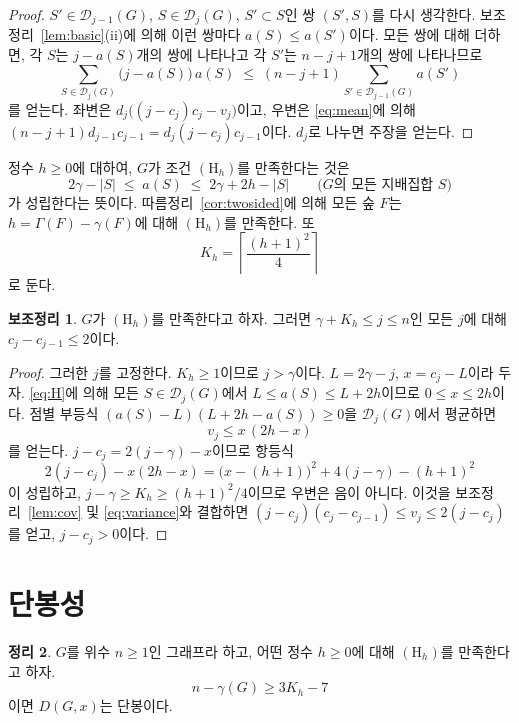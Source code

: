 \documentclass[11pt,a4paper]{article}
\theoremstyle{definition}
\newtheorem{theorem}{정리}[section]
\newtheorem{lemma}[theorem]{보조정리}
\newcommand{\Dom}{\mathcal{D}}
\begin{document}
\begin{proof}
$S'\in\Dom_{j-1}(G)$, $S\in\Dom_j(G)$, $S'\subset S$인 쌍 $(S',S)$를 다시 생각한다.
보조정리~\ref{lem:basic}(ii)에 의해 이런 쌍마다 $a(S)\le a(S')$이다. 모든 쌍에 대해
더하면, 각 $S$는 $j-a(S)$개의 쌍에 나타나고 각 $S'$는 $n-j+1$개의 쌍에 나타나므로
\[
  \sum_{S\in\Dom_j(G)}\bigl(j-a(S)\bigr)\,a(S)\;\le\;
  (n-j+1)\sum_{S'\in\Dom_{j-1}(G)}a(S')
\]
를 얻는다. 좌변은 $d_j\bigl((j-c_j)c_j-v_j\bigr)$이고, 우변은 \eqref{eq:mean}에 의해
$(n-j+1)d_{j-1}c_{j-1}=d_j(j-c_j)c_{j-1}$이다. $d_j$로 나누면 주장을 얻는다.
\end{proof}

정수 $h\ge0$에 대하여, $G$가 조건 $(\mathrm{H}_h)$를 만족한다는 것은
\begin{equation}\label{eq:H}
  2\gamma-|S|\;\le\;a(S)\;\le\;2\gamma+2h-|S|
  \qquad\text{($G$의 모든 지배집합 $S$)}
\end{equation}
가 성립한다는 뜻이다. 따름정리~\ref{cor:twosided}에 의해 모든 숲 $F$는
$h=\Gamma(F)-\gamma(F)$에 대해 $(\mathrm{H}_h)$를 만족한다. 또
\[
  K_h=\left\lceil\frac{(h+1)^2}{4}\right\rceil
\]
로 둔다.

\begin{lemma}\label{lem:jump}
$G$가 $(\mathrm{H}_h)$를 만족한다고 하자. 그러면 $\gamma+K_h\le j\le n$인 모든 $j$에
대해 $c_j-c_{j-1}\le 2$이다.
\end{lemma}

\begin{proof}
그러한 $j$를 고정한다. $K_h\ge1$이므로 $j>\gamma$이다. $L=2\gamma-j$, $x=c_j-L$이라
두자. \eqref{eq:H}에 의해 모든 $S\in\Dom_j(G)$에서 $L\le a(S)\le L+2h$이므로
$0\le x\le 2h$이다. 점별 부등식 $(a(S)-L)(L+2h-a(S))\ge0$을 $\Dom_j(G)$에서 평균하면
\begin{equation}\label{eq:variance}
  v_j\le x\,(2h-x)
\end{equation}
를 얻는다. $j-c_j=2(j-\gamma)-x$이므로 항등식
\[
  2(j-c_j)-x(2h-x)=\bigl(x-(h+1)\bigr)^2+4(j-\gamma)-(h+1)^2
\]
이 성립하고, $j-\gamma\ge K_h\ge(h+1)^2/4$이므로 우변은 음이 아니다. 이것을
보조정리~\ref{lem:cov} 및 \eqref{eq:variance}와 결합하면
$(j-c_j)(c_j-c_{j-1})\le v_j\le 2(j-c_j)$를 얻고, $j-c_j>0$이다.
\end{proof}

\section{단봉성}\label{sec:unimodal}

\begin{theorem}\label{thm:main}
$G$를 위수 $n\ge1$인 그래프라 하고, 어떤 정수 $h\ge0$에 대해 $(\mathrm{H}_h)$를
만족한다고 하자.
\begin{equation}\label{eq:condition}
  n-\gamma(G)\ge 3K_h-7
\end{equation}
이면 $D(G,x)$는 단봉이다.
\end{theorem}
\end{document}
